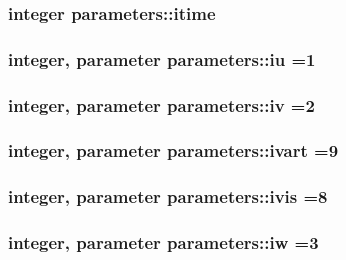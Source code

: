 \hypertarget{classparameters_ac3fd2b2d6db1ca2089e68402d8d64eef}{
\subsubsection[{itime}]{\setlength{\rightskip}{0pt plus 5cm}integer parameters\-::itime}}\label{classparameters_ac3fd2b2d6db1ca2089e68402d8d64eef}
\hypertarget{classparameters_a48e8a3b2787d19bee6b9c5f65f8cfb02}{
\subsubsection[{iu}]{\setlength{\rightskip}{0pt plus 5cm}integer, parameter parameters\-::iu =1}}\label{classparameters_a48e8a3b2787d19bee6b9c5f65f8cfb02}
\hypertarget{classparameters_ab4866f04b22e8c72f3f95e3f46b5d8ae}{
\subsubsection[{iv}]{\setlength{\rightskip}{0pt plus 5cm}integer, parameter parameters\-::iv =2}}\label{classparameters_ab4866f04b22e8c72f3f95e3f46b5d8ae}
\hypertarget{classparameters_a16d579983b52d8fe11efc1c5374cc262}{
\subsubsection[{ivart}]{\setlength{\rightskip}{0pt plus 5cm}integer, parameter parameters\-::ivart =9}}\label{classparameters_a16d579983b52d8fe11efc1c5374cc262}
\hypertarget{classparameters_a2c48c4814b16d64e233b7475c0007051}{
\subsubsection[{ivis}]{\setlength{\rightskip}{0pt plus 5cm}integer, parameter parameters\-::ivis =8}}\label{classparameters_a2c48c4814b16d64e233b7475c0007051}
\hypertarget{classparameters_adb764e48acf52e00f7be49f496487136}{
\subsubsection[{iw}]{\setlength{\rightskip}{0pt plus 5cm}integer, parameter parameters\-::iw =3}}\label{classparameters_adb764e48acf52e00f7be49f496487136}
